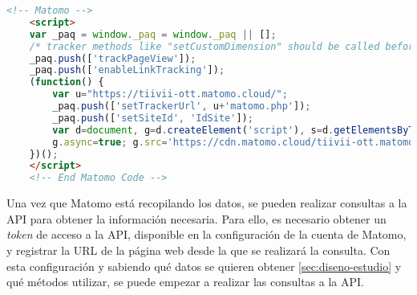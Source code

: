 \begin{lstlisting}[language=HTML]
    <!-- Matomo -->
    <script>
    var _paq = window._paq = window._paq || [];
    /* tracker methods like "setCustomDimension" should be called before "trackPageView" */
    _paq.push(['trackPageView']);
    _paq.push(['enableLinkTracking']);
    (function() {
        var u="https://tiivii-ott.matomo.cloud/";
        _paq.push(['setTrackerUrl', u+'matomo.php']);
        _paq.push(['setSiteId', 'IdSite']);
        var d=document, g=d.createElement('script'), s=d.getElementsByTagName('script')[0];
        g.async=true; g.src='https://cdn.matomo.cloud/tiivii-ott.matomo.cloud/matomo.js'; s.parentNode.insertBefore(g,s);
    })();
    </script>
    <!-- End Matomo Code -->
\end{lstlisting}

Una vez que Matomo está recopilando los datos, se pueden realizar consultas a la API para obtener la información necesaria. 
Para ello, es necesario obtener un \textit{token} de acceso a la API, disponible en la configuración de la cuenta de Matomo, 
y registrar la URL de la página web desde la que se realizará la consulta. Con esta configuración y sabiendo qué datos se quieren 
obtener \ref{sec:diseno-estudio} y qué métodos utilizar, se puede empezar a realizar las consultas a la API.
